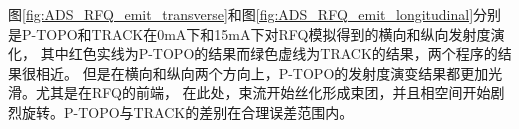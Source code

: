 图\ref{fig:ADS_RFQ_emit_transverse}和图\ref{fig:ADS_RFQ_emit_longitudinal}分别是P-TOPO和TRACK在0mA下和15mA下对RFQ模拟得到的横向和纵向发射度演化，
其中红色实线为P-TOPO的结果而绿色虚线为TRACK的结果，两个程序的结果很相近。
但是在横向和纵向两个方向上，P-TOPO的发射度演变结果都更加光滑。尤其是在RFQ的前端，
在此处，束流开始丝化形成束团，并且相空间开始剧烈旋转。P-TOPO与TRACK的差别在合理误差范围内。


